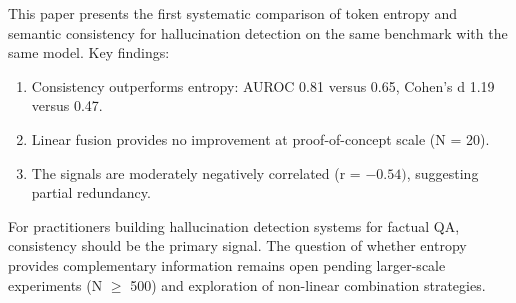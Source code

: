 
This paper presents the first systematic comparison of token entropy and semantic consistency for hallucination detection on the same benchmark with the same model. Key findings:

\begin{enumerate}
\item Consistency outperforms entropy: AUROC 0.81 versus 0.65, Cohen's d 1.19 versus 0.47.
\item Linear fusion provides no improvement at proof-of-concept scale (N = 20).
\item The signals are moderately negatively correlated (r = $-0.54)$, suggesting partial redundancy.
\end{enumerate}

For practitioners building hallucination detection systems for factual QA, consistency should be the primary signal. The question of whether entropy provides complementary information remains open pending larger-scale experiments (N $\geq$ 500) and exploration of non-linear combination strategies.

